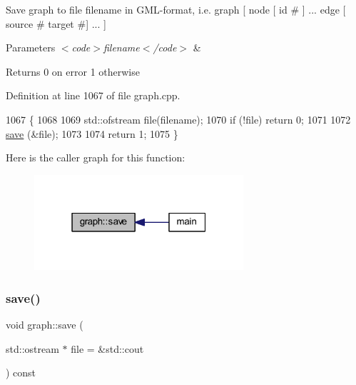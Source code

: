 Save graph to file {\ttfamily filename} in G\+M\+L-\/format, i.\+e. {\ttfamily graph \mbox{[} node \mbox{[} id \# \mbox{]} ... edge \mbox{[} source \# target \#\mbox{]} ... \mbox{]}}


\begin{DoxyParams}{Parameters}
{\em $<$code$>$filename$<$/code$>$} & \\
\hline
\end{DoxyParams}
\begin{DoxyReturn}{Returns}
0 on error 1 otherwise 
\end{DoxyReturn}


Definition at line 1067 of file graph.\+cpp.


\begin{DoxyCode}
1067                                            \{
1068     
1069     std::ofstream file(filename);
1070     \textcolor{keywordflow}{if} (!file) \textcolor{keywordflow}{return} 0;
1071     
1072     \mbox{\hyperlink{classgraph_a7bd0712a528249d1585085a64ac3e661}{save}} (&file);
1073 
1074     \textcolor{keywordflow}{return} 1;
1075 \}
\end{DoxyCode}
Here is the caller graph for this function\+:
\nopagebreak
\begin{figure}[H]
\begin{center}
\leavevmode
\includegraphics[width=220pt]{classgraph_a7bd0712a528249d1585085a64ac3e661_icgraph}
\end{center}
\end{figure}
\mbox{\label{classgraph_ad53bd0f3c96616b7f2d44abdce3df6de}} 
\subsubsection{\texorpdfstring{save()}{save()}\hspace{0.1cm}{\footnotesize\ttfamily [2/2]}}
{\footnotesize\ttfamily void graph\+::save (\begin{DoxyParamCaption}\item[{std\+::ostream $\ast$}]{file = {\ttfamily \&std\+:\+:cout} }\end{DoxyParamCaption}) const\hspace{0.3cm}{\ttfamily [inherited]}}

